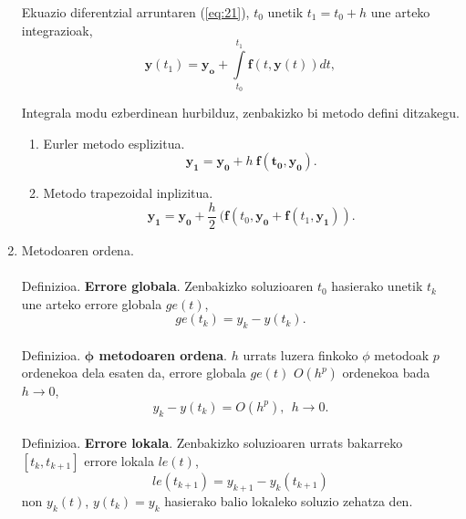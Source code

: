 \begin{enumerate}
Ekuazio diferentzial arruntaren (\ref{eq:21}),  $t_0$ unetik $t_1=t_0+h$ une arteko integrazioak,
\begin{equation*}
\mathbf{y}(t_1)=\mathbf{y_o}+\int\limits_{t_0}^{t_1} \mathbf{f}(t,\mathbf{y}(t)) dt,
\end{equation*}

Integrala modu ezberdinean hurbilduz, zenbakizko bi metodo defini ditzakegu.
   \begin{enumerate}
    \item Eurler metodo esplizitua.
    \begin{equation*}
     \label{eq41}
     \mathbf{y_{1}}=\mathbf{y_0}+h  \ \mathbf{f}(\mathbf{t_0,y_0}).
    \end{equation*} 

    \item Metodo trapezoidal inplizitua.
    \begin{equation*}
    \label{eq41}
    \mathbf{y_{1}}=\mathbf{y_0}+\frac{h}{2}  \ (\mathbf{f}(t_0,\mathbf{y_{0}}+\mathbf{f}(t_1,\mathbf{y_{1}})). 
    \end{equation*} 
    \end{enumerate}

\item Metodoaren ordena.

\paragraph*{}Definizioa. \textbf{Errore globala}. Zenbakizko soluzioaren $t_0$ hasierako unetik $t_k$ une arteko errore globala $ge(t)$,
\begin{equation*}
ge(t_k)=y_k-y(t_k).
\end{equation*}
  
\paragraph*{} Definizioa. \textbf{$\mathbf{\phi}$ metodoaren ordena}. $h$ urrats luzera finkoko $\phi$ metodoak $p$ ordenekoa dela esaten da, errore globala $ge(t)$  $O(h^{p})$ ordenekoa bada  $h \rightarrow 0$,
\begin{equation*}
y_k-y(t_k)=O(h^{p}), \ \ h \rightarrow 0.
\end{equation*}   

\paragraph*{}Definizioa. \textbf{Errore lokala}. Zenbakizko soluzioaren urrats bakarreko $[t_k,t_{k+1}]$ errore lokala $le(t)$,
\begin{equation*}
le(t_{k+1})=y_{k+1}-y_k(t_{k+1})
\end{equation*}  
non $y_k(t)$, $y(t_k)=y_k$ hasierako balio lokaleko soluzio zehatza den. 


\end{enumerate}
